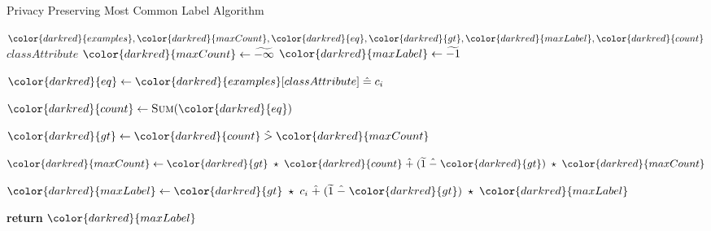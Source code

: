 \begin{algorithm}[H]
\caption{Privacy Preserving Most Common Label Algorithm}\label{a:id3-most-common-label-pp}
\begin{algorithmic}[1]
\renewcommand{\algorithmicrequire}{\textbf{Private Vars:}}
\Require ${\color{darkred}{examples}}, {\color{darkred}{maxCount}}, {\color{darkred}{eq}}, {\color{darkred}{gt}}, {\color{darkred}{maxLabel}}, {\color{darkred}{count}}$
\renewcommand{\algorithmicrequire}{\textbf{Global Vars:}}
\Require $classAttribute$
  \State ${\color{darkred}{maxCount}} \gets \enc{-\infty}$
  \State ${\color{darkred}{maxLabel}} \gets \enc{-1}$


      \State ${\color{darkred}{eq}} \gets {\color{darkred}{examples}}[classAttribute] \heq c_i$ 

      \State ${\color{darkred}{count}} \gets \textsc{Sum}({\color{darkred}{eq}})$

      \State ${\color{darkred}{gt}} \gets {\color{darkred}{count}} \hgt  {\color{darkred}{maxCount}}$

      \State ${\color{darkred}{maxCount}} \gets {\color{darkred}{gt}} \hmul {\color{darkred}{count}} \hplus (\enc{1} \hminus {\color{darkred}{gt}}) \hmul {\color{darkred}{maxCount}}$ 

      \State ${\color{darkred}{maxLabel}} \gets {\color{darkred}{gt}} \hmul c_i \hplus (\enc{1} \hminus {\color{darkred}{gt}}) \hmul {\color{darkred}{maxLabel}}$


    \EndFor

    \State \textbf{return} ${\color{darkred}{maxLabel}}$
\EndProcedure
\end{algorithmic}
\end{algorithm}
